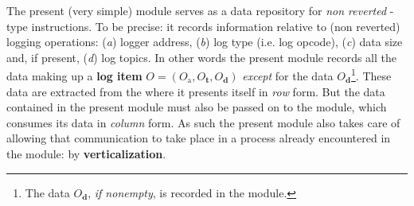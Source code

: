 The present (very simple) \logInfoMod{} module serves as a data repository for \emph{non reverted} -type instructions. To be precise: it records information relative to (non reverted) logging operations:
(\emph{a})
logger address,
(\emph{b})
log type (i.e. log opcode),
(\emph{c})
data size and, if present,
(\emph{d})
log topics.
In other words the present module records all the data making up a \textbf{log item} $O = (O_\text{a}, O_\textbf{t}, O_\textbf{d})$ \emph{except} for the data $O_\textbf{d}$\footnote{The data $O_\textbf{d}$, \emph{if nonempty}, is recorded in the \logDataMod{} module.}.  These data are extracted from the \hubMod{} where it presents itself in \emph{row} form. But the data contained in the present module must also be passed on to the \rlpTxnRcptMod{} module, which consumes its data in \emph{column} form. As such the present module also takes care of allowing that communication to take place in a process already encountered in the \txnDataMod{} module: by \textbf{verticalization}.
